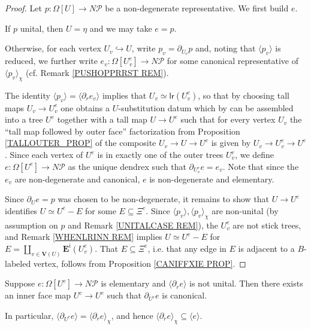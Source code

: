 \documentclass[a4paper,10pt
,draft
]{article}%
\renewcommand{\1}{\eta}%
\begin{document}
\begin{proof}
Let $p\colon \Omega[U] \to N \mathcal{P}$
be a non-degenerate representative. We first build $e$.

If $p$ unital, then $U = \eta$ and we may take $e = p$.

Otherwise, for each vertex $U_v \hookrightarrow U$, write
$p_v = \partial_{U_v} p$
and,
noting that $\langle p_v \rangle$ is reduced,
we further write 
$e_v \colon \Omega[U^e_v] \to N \mathcal{P}$
for some canonical representative of 
$\langle p_v \rangle_{\chi}$
(cf. Remark \ref{PUSHOPPRRST REM}).


The identity
$\langle p_v \rangle = \langle \partial_r e_v \rangle$
implies that
$U_v \simeq \mathsf{lr}(U^e_v)$,
so that by choosing tall maps $U_v \to U^e_v$ 
one obtains a $U$-substitution datum
\cite[Def. 3.38]{BP_geo}
which by 
\cite[Prop. 3.41]{BP_geo}
can be assembled into a tree $U^e$
together with a tall map
$U \to U^e$ such that for every vertex $U_v$
the ``tall map followed by outer face'' factorization from Proposition \ref{TALLOUTER_PROP} of
the composite
$U_v \to U \to U^e$
is given by
$U_v \to U^e_v \to U^e$.
Since each vertex of $U^e$ is in exactly one of the outer trees $U^e_v$,
we define $e \colon \Omega[U^e] \to N \mathcal{P}$
as the unique dendrex such that
$\partial_{U^e_v} e = e_v$.
Note that since the $e_v$ are non-degenerate and canonical, $e$ is non-degenerate and elementary. %


Since $\partial_{U}e = p$ was chosen to be non-degenerate,
it remains to show that
$U \to U^e$ identifies $U \simeq U^e - E$
for some $E \subseteq \Xi^{e}$.
Since $\langle p_v \rangle, \langle p_v \rangle_{\chi}$ are non-unital
(by assumption on $p$ and Remark \ref{UNITALCASE REM}),
the $U^e_v$ are not stick trees,
and Remark \ref{WHENLRINN REM} implies
$U \simeq U^e-E$ for 
$E = \amalg_{v \in \boldsymbol{V}(U)} \boldsymbol{E}^{\mathsf{i}}(U^e_v)$.
%
That
$E \subseteq \Xi^{e}$, i.e. that any edge in $E$ is adjacent to a $B$-labeled vertex,
follows from Proposition \ref{CANIFFXIE PROP}.
\end{proof}


\begin{lemma}\label{FORSAKEN LEM}
Suppose $e \colon \Omega[U^e] \to N \mathcal{P}$ is elementary
and $\langle \partial_r e\rangle$ is not unital.
Then there exists an inner face map
$U^c \to U^e$ such that $\partial_{U^c} e$ is canonical.

In particular,
$\langle \partial_{U^c} e \rangle = \langle \partial_r e \rangle_{\chi}$,
and hence 
$\langle \partial_r e \rangle_{\chi} \subseteq \langle e \rangle$.
\end{lemma}
\end{document}
